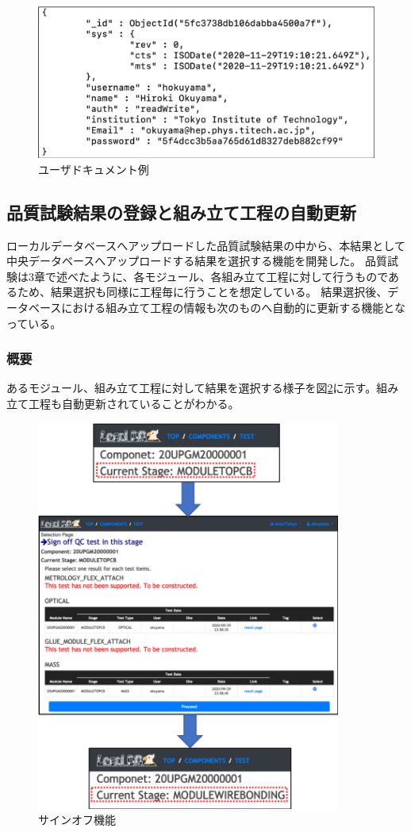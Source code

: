 \begin{figure}[bpt]\centering
\includegraphics[width=12cm]{user_ex}
\caption[ユーザドキュメント例]{ユーザドキュメント例}
\label{user_ex}
\end{figure}

\newpage
\subsection{品質試験結果の登録と組み立て工程の自動更新}
ローカルデータベースへアップロードした品質試験結果の中から、本結果として中央データベースへアップロードする結果を選択する機能を開発した。
品質試験は3章で述べたように、各モジュール、各組み立て工程に対して行うものであるため、結果選択も同様に工程毎に行うことを想定している。
結果選択後、データベースにおける組み立て工程の情報も次のものへ自動的に更新する機能となっている。

\subsubsection{概要}
あるモジュール、組み立て工程に対して結果を選択する様子を図\ref{webapp_sign_off}に示す。組み立て工程も自動更新されていることがわかる。

\begin{figure}[bpt]\centering
\includegraphics[width=10cm]{webapp_sign_off}
\caption[サインオフ機能]{サインオフ機能}
\label{webapp_sign_off}
\end{figure}


